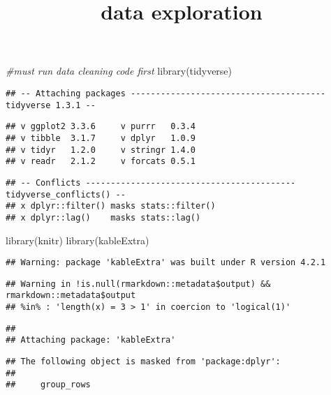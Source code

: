 \documentclass[
]{article}
\title{data exploration}
\author{}
\date{\vspace{-2.5em}}
\newenvironment{Shaded}{\begin{snugshade}}{\end{snugshade}}
\newcommand{\CommentTok}[1]{\textcolor[rgb]{0.56,0.35,0.01}{\textit{#1}}}
\newcommand{\FunctionTok}[1]{\textcolor[rgb]{0.00,0.00,0.00}{#1}}
\newcommand{\NormalTok}[1]{#1}
\begin{document}
\maketitle

\begin{Shaded}
\begin{Highlighting}[]
\CommentTok{\#must run data cleaning code first}
\FunctionTok{library}\NormalTok{(tidyverse)}
\end{Highlighting}
\end{Shaded}

\begin{verbatim}
## -- Attaching packages --------------------------------------- tidyverse 1.3.1 --
\end{verbatim}

\begin{verbatim}
## v ggplot2 3.3.6     v purrr   0.3.4
## v tibble  3.1.7     v dplyr   1.0.9
## v tidyr   1.2.0     v stringr 1.4.0
## v readr   2.1.2     v forcats 0.5.1
\end{verbatim}

\begin{verbatim}
## -- Conflicts ------------------------------------------ tidyverse_conflicts() --
## x dplyr::filter() masks stats::filter()
## x dplyr::lag()    masks stats::lag()
\end{verbatim}

\begin{Shaded}
\begin{Highlighting}[]
\FunctionTok{library}\NormalTok{(knitr)}
\FunctionTok{library}\NormalTok{(kableExtra)}
\end{Highlighting}
\end{Shaded}

\begin{verbatim}
## Warning: package 'kableExtra' was built under R version 4.2.1
\end{verbatim}

\begin{verbatim}
## Warning in !is.null(rmarkdown::metadata$output) && rmarkdown::metadata$output
## %in% : 'length(x) = 3 > 1' in coercion to 'logical(1)'
\end{verbatim}

\begin{verbatim}
## 
## Attaching package: 'kableExtra'
\end{verbatim}

\begin{verbatim}
## The following object is masked from 'package:dplyr':
## 
##     group_rows
\end{verbatim}
\end{document}
